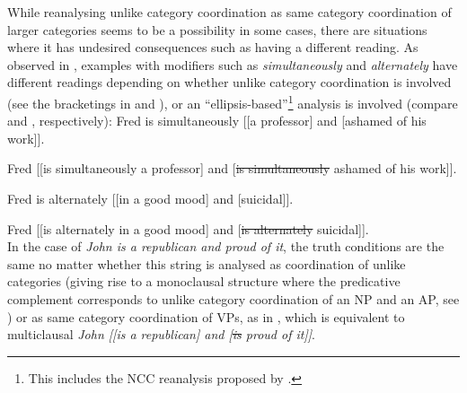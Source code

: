 \documentclass[output=paper]{../langscibook}
\begin{document}
While reanalysing unlike category coordination as same
category coordination of larger categories seems to be a possibility in some cases,
there are situations where it has undesired consequences such as
having a different reading. As observed in \citet{dalr:17},
examples with modifiers such as \emph{simultaneously} and
\emph{alternately} have different readings depending on whether unlike
category coordination is involved (see the bracketings in
 and ), or an
``ellipsis-based''\footnote{This includes the NCC reanalysis proposed by \citet{max:man:96}.} analysis is involved (compare 
and , respectively):
\ea\label{ex:dalr:17:16a} Fred is simultaneously [[a professor] and [ashamed of his work]].\\ \hspace*{\fill} \citep[(16a)]{dalr:17}
  \item\label{ex:dalr:17:16b} Fred [[is simultaneously a professor] and [\st{is simultaneously} ashamed of his work]]. \hfill\citep[(16b)]{dalr:17}
  \item\label{ex:dalr:17:17a} Fred is alternately [[in a good mood] and [suicidal]]. \\\hspace*{\fill}\citep[(17a)]{dalr:17}
  \item\label{ex:dalr:17:17b} Fred [[is alternately in a good mood] and [\st{is alternately} suicidal]].\\ \hspace*{\fill} \citep[(17b)]{dalr:17}
\z
In the case of \emph{John is a republican and proud of it},
the truth conditions are the same no matter whether this string is analysed as
coordination of unlike categories (giving rise to a
monoclausal structure where the predicative complement corresponds to
unlike category coordination of an NP and an AP, see ) or as same category coordination of
VPs, as in , which is equivalent to
multiclausal \emph{John
  [[is a republican] and [\st{is} proud of it]]}.
\end{document}
